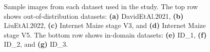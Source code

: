 \documentclass[12pt,a4paper,oneside]{report}
\begin{document}
{\begin{landscape}
\begin{figure}[p]
\begin{adjustwidth}{-2cm}{-2cm}
  \vspace{0.5cm}
  \hfill
  \hfill
  
  \caption{Sample images from each dataset used in the study. The top row shows out-of-distribution datasets: 
  \textbf{(a)} DavidEtAl.2021, \textbf{(b)} LiuEtAl.2022, \textbf{(c)} Internet Maize stage V3, and 
  \textbf{(d)} Internet Maize stage V5. The bottom row shows in-domain datasets: 
  \textbf{(e)} ID\_1, \textbf{(f)} ID\_2, and \textbf{(g)} ID\_3.}
  \label{fig:datasets}  
  \end{adjustwidth}
\end{figure}
\end{landscape}
\clearpage
}
\end{document}
